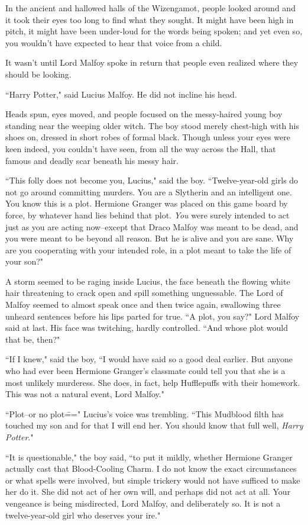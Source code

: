 In the ancient and hallowed halls of the Wizengamot, people looked around and it took their eyes too long to find what they sought. It might have been high in pitch, it might have been under-loud for the words being spoken; and yet even so, you wouldn't have expected to hear that voice from a child.

It wasn't until Lord Malfoy spoke in return that people even realized where they should be looking.

``Harry Potter," said Lucius Malfoy. He did not incline his head.

Heads spun, eyes moved, and people focused on the messy-haired young boy standing near the weeping older witch. The boy stood merely chest-high with his shoes on, dressed in short robes of formal black. Though unless your eyes were keen indeed, you couldn't have seen, from all the way across the Hall, that famous and deadly scar beneath his messy hair.

``This folly does not become you, Lucius," said the boy. ``Twelve-year-old girls do not go around committing murders. You are a Slytherin and an intelligent one. You know this is a plot. Hermione Granger was placed on this game board by force, by whatever hand lies behind that plot. \emph{You} were surely intended to act just as you are acting now\---except that Draco Malfoy was meant to be dead, and you were meant to be beyond all reason. But he is alive and you are sane. Why are you cooperating with your intended role, in a plot meant to take the life of your son?"

A storm seemed to be raging inside Lucius, the face beneath the flowing white hair threatening to crack open and spill something unguessable. The Lord of Malfoy seemed to almost speak once and then twice again, swallowing three unheard sentences before his lips parted for true. ``A plot, you say?" Lord Malfoy said at last. His face was twitching, hardly controlled. ``And whose plot would that be, then?"

``If I knew," said the boy, ``I would have said so a good deal earlier. But anyone who had ever been Hermione Granger's classmate could tell you that she is a most unlikely murderess. She does, in fact, help Hufflepuffs with their homework. This was not a natural event, Lord Malfoy."

``Plot\---or no plot\===" Lucius's voice was trembling. ``This Mudblood filth has touched my son and for that I will end her. You should know that full well, \emph{Harry Potter}."

``It is questionable," the boy said, ``to put it mildly, whether Hermione Granger actually cast that Blood-Cooling Charm. I do not know the exact circumstances or what spells were involved, but simple trickery would not have sufficed to make her do it. She did not act of her own will, and perhaps did not act at all. Your vengeance is being misdirected, Lord Malfoy, and deliberately so. It is not a twelve-year-old girl who deserves your ire."

